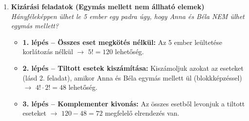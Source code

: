 \documentclass[11pt, a4paper]{article}
\begin{document}
\begin{enumerate}[label=\arabic*., leftmargin=*]
    \begin{itemize}
        \item \textbf{1. lépés – A "csomagok" rendezése:} Bélát és Cilit gondolatban \textbf{összeragasztjuk}, mintha ők egyetlen "csomag" lennének. Így az 5 emberből 4 "csomagunk" lett (3 normál ember + 1 ragasztott páros). Ezt a 4 csomagot $4!$-féleképpen rakhatjuk sorba.
        \item \textbf{2. lépés – FIGYELEM! A belső helycsere:} Sok diák itt megáll, és azt hiszi, $4!$ a végeredmény. \textbf{De ne feledd:} a "ragasztott csomagon" belül Béla és Cili még helyet cserélhetnek (Béla-Cili vagy Cili-Béla), ami újabb $2!=2$ lehetőséget jelent!
        \item \textbf{A hibátlan megoldás:} A külső és belső lehetőségeket össze kell szoroznunk: \textbf{$4! \cdot 2! = 24 \cdot 2 = 48$}. Tehát 48-féleképpen ülhetnek le.
    \end{itemize}

    \vspace{0.4cm}

    \item \textbf{Kizárási feladatok (Egymás mellett nem állható elemek)}\\
    \textit{Hányféleképpen ülhet le 5 ember egy padra úgy, hogy Anna és Béla NEM ülhet egymás mellett?}
    \begin{itemize}
        \item \textbf{1. lépés -- Összes eset megkötés nélkül:} Az 5 ember leültetése korlátozás nélkül $\rightarrow$ $5! = 120$ lehetőség.
        \item \textbf{2. lépés -- Tiltott esetek kiszámítása:} Kiszámoljuk azokat az eseteket (lásd 2. feladat), amikor Anna és Béla egymás mellett ül (blokkképzéssel) $\rightarrow$ $4! \cdot 2! = 48$ lehetőség.
        \item \textbf{3. lépés -- Komplementer kivonás:} Az összes esetből levonjuk a tiltott eseteket $\rightarrow$ $120 - 48 = 72$ megfelelő elrendezés van.
    \end{itemize}


\end{enumerate}
\end{document}
